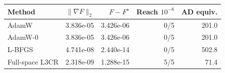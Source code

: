 \begin{tabular}{lrrrr}
\toprule
Method & $\|\nabla F\|_2$ & $F-F^\star$ & Reach $10^{-8}$ & AD equiv. \\
\midrule
AdamW & 3.836e-05 & 3.426e-06 & 0/5 & 201.0 \\
AdamW-0 & 3.836e-05 & 3.426e-06 & 0/5 & 201.0 \\
L-BFGS & 4.741e-08 & 2.440e-14 & 0/5 & 502.8 \\
Full-space L3CR & 2.318e-09 & 1.288e-15 & 5/5 & 71.4 \\
\bottomrule
\end{tabular}
